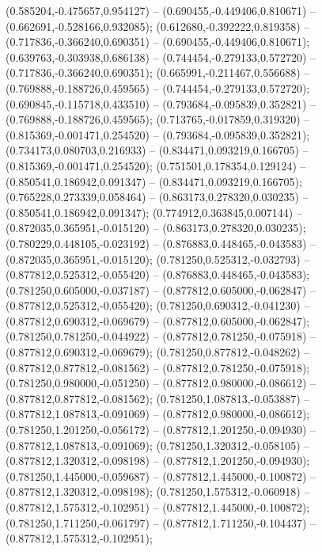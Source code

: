  (0.585204,-0.475657,0.954127) -- (0.690455,-0.449406,0.810671) -- (0.662691,-0.528166,0.932085);
 (0.612680,-0.392222,0.819358) -- (0.717836,-0.366240,0.690351) -- (0.690455,-0.449406,0.810671);
 (0.639763,-0.303938,0.686138) -- (0.744454,-0.279133,0.572720) -- (0.717836,-0.366240,0.690351);
 (0.665991,-0.211467,0.556688) -- (0.769888,-0.188726,0.459565) -- (0.744454,-0.279133,0.572720);
 (0.690845,-0.115718,0.433510) -- (0.793684,-0.095839,0.352821) -- (0.769888,-0.188726,0.459565);
 (0.713765,-0.017859,0.319320) -- (0.815369,-0.001471,0.254520) -- (0.793684,-0.095839,0.352821);
 (0.734173,0.080703,0.216933) -- (0.834471,0.093219,0.166705) -- (0.815369,-0.001471,0.254520);
 (0.751501,0.178354,0.129124) -- (0.850541,0.186942,0.091347) -- (0.834471,0.093219,0.166705);
 (0.765228,0.273339,0.058464) -- (0.863173,0.278320,0.030235) -- (0.850541,0.186942,0.091347);
 (0.774912,0.363845,0.007144) -- (0.872035,0.365951,-0.015120) -- (0.863173,0.278320,0.030235);
 (0.780229,0.448105,-0.023192) -- (0.876883,0.448465,-0.043583) -- (0.872035,0.365951,-0.015120);
 (0.781250,0.525312,-0.032793) -- (0.877812,0.525312,-0.055420) -- (0.876883,0.448465,-0.043583);
 (0.781250,0.605000,-0.037187) -- (0.877812,0.605000,-0.062847) -- (0.877812,0.525312,-0.055420);
 (0.781250,0.690312,-0.041230) -- (0.877812,0.690312,-0.069679) -- (0.877812,0.605000,-0.062847);
 (0.781250,0.781250,-0.044922) -- (0.877812,0.781250,-0.075918) -- (0.877812,0.690312,-0.069679);
 (0.781250,0.877812,-0.048262) -- (0.877812,0.877812,-0.081562) -- (0.877812,0.781250,-0.075918);
 (0.781250,0.980000,-0.051250) -- (0.877812,0.980000,-0.086612) -- (0.877812,0.877812,-0.081562);
 (0.781250,1.087813,-0.053887) -- (0.877812,1.087813,-0.091069) -- (0.877812,0.980000,-0.086612);
 (0.781250,1.201250,-0.056172) -- (0.877812,1.201250,-0.094930) -- (0.877812,1.087813,-0.091069);
 (0.781250,1.320312,-0.058105) -- (0.877812,1.320312,-0.098198) -- (0.877812,1.201250,-0.094930);
 (0.781250,1.445000,-0.059687) -- (0.877812,1.445000,-0.100872) -- (0.877812,1.320312,-0.098198);
 (0.781250,1.575312,-0.060918) -- (0.877812,1.575312,-0.102951) -- (0.877812,1.445000,-0.100872);
 (0.781250,1.711250,-0.061797) -- (0.877812,1.711250,-0.104437) -- (0.877812,1.575312,-0.102951);
